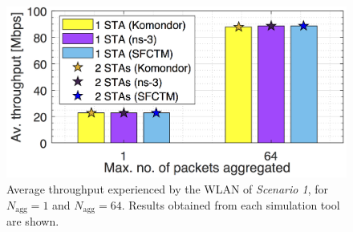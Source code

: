 \documentclass{article}
\begin{document}
	\begin{figure}[t]
		\centering		
		\includegraphics[width=0.6\columnwidth]{results_scenario_1.png}
		\caption{Average throughput experienced by the WLAN of \textit{Scenario 1}, for $N_{\text{agg}} = 1$ and $N_{\text{agg}} = 64$. Results obtained from each simulation tool are shown.}
		\label{fig:results_simple_scenarios}
	\end{figure}
	
\end{document}
